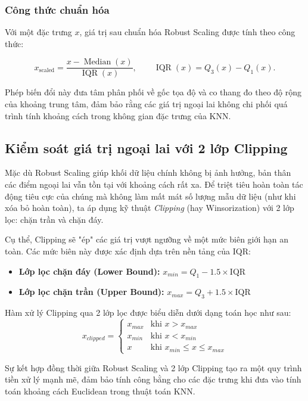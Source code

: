 \documentclass[12pt,a4paper]{article}
\begin{document}
\subsubsection*{Công thức chuẩn hóa}

Với một đặc trưng $x$, giá trị sau chuẩn hóa Robust Scaling được tính
theo công thức:

\begin{equation}
    x_{\mathrm{scaled}} = \frac{x - \operatorname{Median}(x)}{\operatorname{IQR}(x)},
    \qquad \operatorname{IQR}(x) = Q_3(x) - Q_1(x).
\end{equation}

Phép biến đổi này đưa tâm phân phối về gốc tọa độ và co thang đo
theo độ rộng của khoảng trung tâm, đảm bảo rằng các giá trị ngoại
lai không chi phối quá trình tính khoảng cách trong không gian đặc
trưng của KNN.
\subsection{Kiểm soát giá trị ngoại lai với 2 lớp Clipping}
Mặc dù Robust Scaling giúp khối dữ liệu chính không bị ảnh hưởng, bản thân các điểm ngoại lai vẫn tồn tại với khoảng cách rất xa. Để triệt tiêu hoàn toàn tác động tiêu cực của chúng mà không làm mất mát số lượng mẫu dữ liệu (như khi xóa bỏ hoàn toàn), ta áp dụng kỹ thuật \textit{Clipping} (hay Winsorization) với 2 lớp lọc: chặn trần và chặn đáy.

Cụ thể, Clipping sẽ "ép" các giá trị vượt ngưỡng về một mức biên giới hạn an toàn. Các mức biên này được xác định dựa trên nền tảng của IQR:
\begin{itemize}
    \item \textbf{Lớp lọc chặn đáy (Lower Bound):} $x_{min} = Q_1 - 1.5 \times \text{IQR}$
    \item \textbf{Lớp lọc chặn trần (Upper Bound):} $x_{max} = Q_3 + 1.5 \times \text{IQR}$
\end{itemize}

Hàm xử lý Clipping qua 2 lớp lọc được biểu diễn dưới dạng toán học như sau:
$$
x_{clipped} = 
\begin{cases} 
x_{max} & \text{khi } x > x_{max} \\
x_{min} & \text{khi } x < x_{min} \\
x & \text{khi } x_{min} \le x \le x_{max}
\end{cases}
$$

Sự kết hợp đồng thời giữa Robust Scaling và 2 lớp Clipping tạo ra một quy trình tiền xử lý mạnh mẽ, đảm bảo tính công bằng cho các đặc trưng khi đưa vào tính toán khoảng cách Euclidean trong thuật toán KNN.
\end{document}
